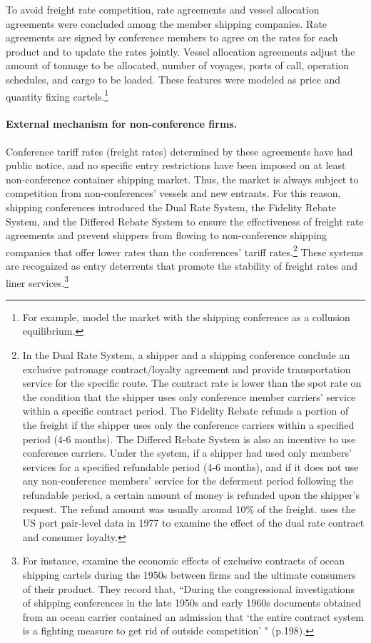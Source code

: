 \documentclass[11pt]{article}
\begin{document}
To avoid freight rate competition, rate agreements and vessel allocation agreements were concluded among the member shipping companies. Rate agreements are signed by conference members to agree on the rates for each product and to update the rates jointly. Vessel allocation agreements adjust the amount of tonnage to be allocated, number of voyages, ports of call, operation schedules, and cargo to be loaded. These features were modeled as price and quantity fixing cartels.\footnote{For example, \cite{clyde1998market} model the market with the shipping conference as a collusion equilibrium.}

\paragraph{External mechanism for non-conference firms.}
Conference tariff rates (freight rates) determined by these agreements have had public notice, and no specific entry restrictions have been imposed on at least non-conference container shipping market. Thus, the market is always subject to competition from non-conferences' vessels and new entrants. For this reason, shipping conferences introduced the Dual Rate System, the Fidelity Rebate System, and the Differed Rebate System to ensure the effectiveness of freight rate agreements and prevent shippers from flowing to non-conference shipping companies that offer lower rates than the conferences' tariff rates.\footnote{In the Dual Rate System, a shipper and a shipping conference conclude an exclusive patronage contract/loyalty agreement and provide transportation service for the specific route. The contract rate is lower than the spot rate on the condition that the shipper uses only conference member carriers' service within a specific contract period. The Fidelity Rebate refunds a portion of the freight if the shipper uses only the conference carriers within a specified period (4-6 months). The Differed Rebate System is also an incentive to use conference carriers. Under the system, if a shipper had used only members' services for a specified refundable period (4-6 months), and if it does not use any non-conference members' service for the deferment period following the refundable period, a certain amount of money is refunded upon the shipper's request. The refund amount was usually around 10\% of the freight. \cite{fox1992empirical} uses the US port pair-level data in 1977 to examine the effect of the dual rate contract and consumer loyalty.} These systems are recognized as entry deterrents that promote the stability of freight rates and liner services.\footnote{For instance, \cite{marin2003exclusive} examine the economic effects of exclusive contracts of ocean shipping cartels during the 1950s between firms and the ultimate consumers of their product. They record that, ``During the congressional investigations of shipping conferences in the late 1950s and early 1960s documents obtained from an ocean carrier contained an admission that ‘the entire contract system is a fighting measure to get rid of outside competition' " (p.198).}
\end{document}
